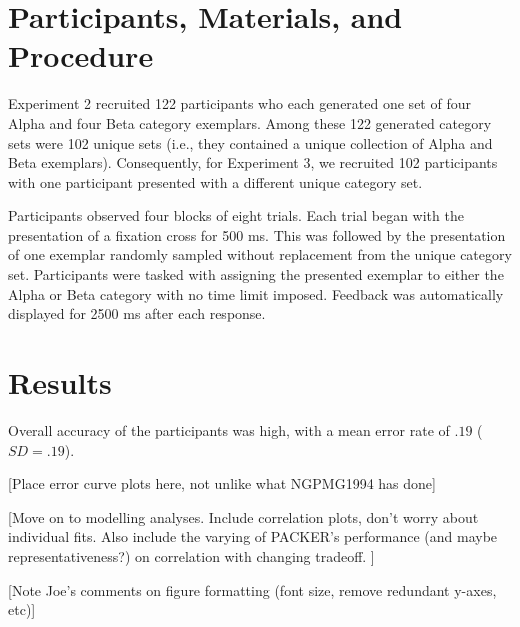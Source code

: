 

% 

\section{Participants, Materials, and Procedure}

Experiment 2 recruited 122 participants who each generated one set of four Alpha
and four Beta category exemplars. Among these 122 generated category sets were
102 unique sets (i.e., they contained a unique collection of Alpha and Beta
exemplars). Consequently, for Experiment 3, we recruited 102 participants with
one participant presented with a different unique category set.

Participants observed four blocks of eight trials. Each trial began with the
presentation of a fixation cross for 500 ms. This was followed by the
presentation of one exemplar randomly sampled without replacement from the
unique category set. Participants were tasked with assigning the presented
exemplar to either the Alpha or Beta category with no time limit imposed.
Feedback was automatically displayed for 2500 ms after each response. 

\section{Results}

Overall accuracy of the participants was high, with a mean error rate of $.19$
($SD = .19$). 

[Place error curve plots here, not unlike what NGPMG1994 has done]

[Move on to modelling analyses. Include correlation plots, don't worry about
individual fits. Also include the varying of PACKER's performance (and maybe
representativeness?) on correlation with changing tradeoff. ]

[Note Joe's comments on figure formatting (font size, remove redundant y-axes, etc)]













